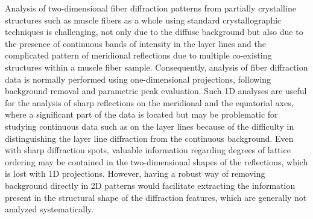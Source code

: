 \documentclass[iucr,review]{iucrjournals}
\begin{document}


Analysis of two-dimensional fiber diffraction patterns
from partially crystalline structures such as muscle fibers as a whole using
standard crystallographic techniques is challenging, not only due to the diffuse background but also due to the presence of continuous bands of intensity in the layer
lines and the complicated pattern of meridional reflections due to multiple co-existing structures within a muscle fiber sample. 
Consequently, analysis of fiber diffraction data is normally performed using one-dimensional projections, following background removal and parametric peak evaluation.
Such 1D analyses are useful for the analysis of sharp reflections on the meridional and the equatorial axes, where a significant part of the data is located but may be problematic
for studying continuous data such as on the layer lines because of the difficulty in distinguishing the layer line diffraction from the continuous background.
Even with sharp diffraction spots, valuable information regarding degrees of lattice ordering may be contained in the two-dimensional shapes of the reflections,
which is lost with 1D projections.
However, having a robust way of removing background directly in 2D patterns would facilitate extracting
the information present in the structural shape of the diffraction features, which are generally not analyzed systematically.
 
\end{document}
